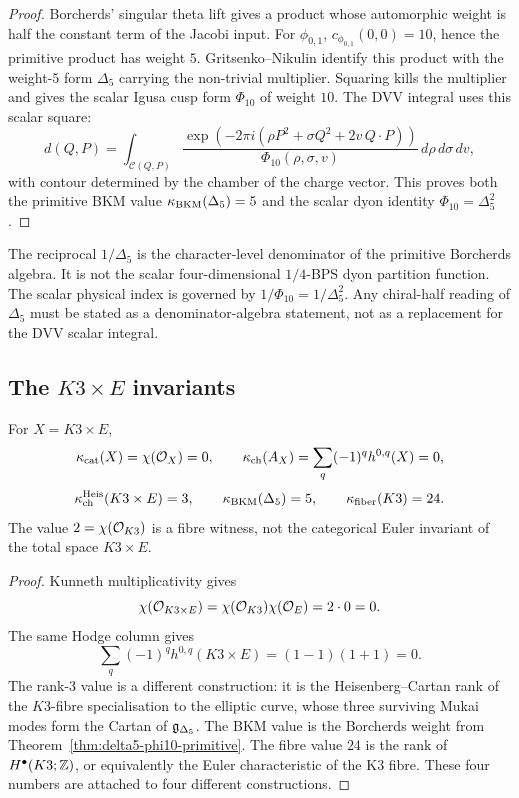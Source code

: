 \begin{proof}
Borcherds' singular theta lift gives a product whose automorphic weight
is half the constant term of the Jacobi input. For
$\phi_{0,1}$, $c_{\phi_{0,1}}(0,0)=10$, hence the primitive product has
weight $5$. Gritsenko--Nikulin identify this product with the
weight-$5$ form $\Delta_5$ carrying the non-trivial multiplier. Squaring
kills the multiplier and gives the scalar Igusa cusp form
$\Phi_{10}$ of weight $10$. The DVV integral uses this scalar square:
\[
 d(Q,P)=\int_{\mathcal C(Q,P)}
 \frac{\exp\!\left(-2\pi i(\rho P^2+\sigma Q^2+2v\,Q\cdot P)\right)}
 {\Phi_{10}(\rho,\sigma,v)}\,d\rho\,d\sigma\,dv ,
\]
with contour determined by the chamber of the charge vector. This proves
both the primitive BKM value $\kappa_{\mathrm{BKM}}(\Delta_5)=5$ and the scalar dyon
identity $\Phi_{10}=\Delta_5^2$.
\end{proof}

\begin{remark}
\label{rem:no-scalar-square-root-dyon-count}
The reciprocal $1/\Delta_5$ is the character-level denominator of the
primitive Borcherds algebra. It is not the scalar four-dimensional
$1/4$-BPS dyon partition function. The scalar physical index is governed
by $1/\Phi_{10}=1/\Delta_5^2$. Any chiral-half reading of
$\Delta_5$ must be stated as a denominator-algebra statement, not as a
replacement for the DVV scalar integral.
\end{remark}

\subsection*{The \texorpdfstring{$K3\times E$}{K3 x E} invariants}
\label{subsec:k3e-invariants}

\begin{proposition}
\label{prop:k3e-four-invariants-heterotic-note}
For $X=K3\times E$,
\[
 \kappa_{\mathrm{cat}}(X)=\chi(\mathcal{O}_X)=0,\qquad
 \kappa_{\mathrm{ch}}(A_X)=\sum_q(-1)^q h^{0,q}(X)=0,
\]
\[
 \kappa_{\mathrm{ch}}^{\mathrm{Heis}}(K3\times E)=3,\qquad
 \kappa_{\mathrm{BKM}}(\Delta_5)=5,\qquad
 \kappa_{\mathrm{fiber}}(K3)=24 .
\]
The value $2=\chi(\mathcal{O}_{K3})$ is a fibre witness, not the categorical
Euler invariant of the total space $K3\times E$.
\end{proposition}

\begin{proof}
Kunneth multiplicativity gives
\[
 \chi(\mathcal{O}_{K3\times E})=\chi(\mathcal{O}_{K3})\chi(\mathcal{O}_E)=2\cdot 0=0.
\]
The same Hodge column gives
\[
 \sum_q(-1)^qh^{0,q}(K3\times E)=(1-1)(1+1)=0.
\]
The rank-$3$ value is a different construction: it is the
Heisenberg--Cartan rank of the $K3$-fibre specialisation to the elliptic
curve, whose three surviving Mukai modes form the Cartan of
$\mathfrak{g}_{\Delta_5}$. The BKM value is the Borcherds weight from
Theorem~\ref{thm:delta5-phi10-primitive}. The fibre value $24$ is the
rank of $H^\bullet(K3;\mathbb{Z})$, or equivalently the Euler characteristic of
the K3 fibre. These four numbers are attached to four different
constructions.
\end{proof}

